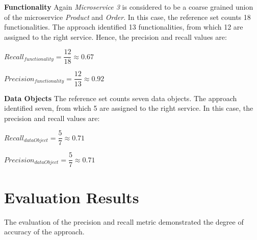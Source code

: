 \noindent
\textbf{Functionality} Again \textit{Microservice 3} is considered to be a coarse grained union of the microservice \textit{Product} and \textit{Order}. In this case, the reference set counts 18 functionalities. The approach identified 13 functionalities, from which 12 are assigned to the right service. Hence, the precision and recall values are:

\hspace{1cm}
\noindent
\begin{minipage}{.4\linewidth}
	\vspace{0.5cm}
	\flushleft
	
	
	$Recall_{functionality}=\dfrac{12}{18} \approx 0.67  $
	\vspace{0.5cm}
	
\end{minipage}%
\begin{minipage}{.5\linewidth}
	\vspace{0.5cm}
	\flushleft
	
	
	$Precision_{functionality}=\dfrac{12}{13} \approx 0.92  $
	\vspace{0.5cm}
	
\end{minipage}


\noindent
\textbf{Data Objects} The reference set counts seven data objects. The approach identified seven, from which 5 are assigned to the right service. In this case, the precision and recall values are:


\hspace{1cm}
\noindent
\begin{minipage}{.4\linewidth}
	\vspace{0.5cm}
	\flushleft
	
	
	$Recall_{dataObject}=\dfrac{5}{7} \approx 0.71  $
	\vspace{0.5cm}
	
\end{minipage}%
\begin{minipage}{.5\linewidth}
	\vspace{0.5cm}
	\flushleft
	
	
	$Precision_{dataObject}=\dfrac{5}{7} \approx 0.71  $
	\vspace{0.5cm}
	
\end{minipage}

\section{Evaluation Results}
\label{sec:Evalutation:Results}
The evaluation of the precision and recall metric demonstrated the degree of accuracy of the approach. 



